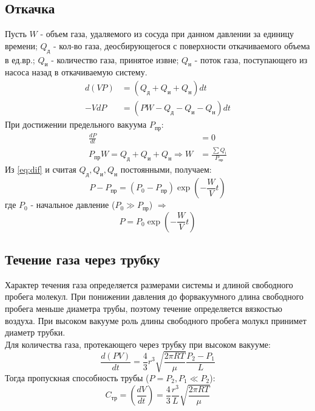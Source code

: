 \subsection*{Откачка}
Пусть $W$ - объем газа, удаляемого из сосуда при данном давлении за 
единицу времени; $Q_{\text{д}}$ - кол-во газа, деосбирующегося с поверхности 
откачиваемого объема в ед.вр.; $Q_{\text{и}}$ - количество газа, принятое
извне; $Q_{\text{н}}$ - поток газа, поступающего из насоса назад в
откачиваемую систему. 
\begin{align}
    d(VP) &= (Q_{\text{д}} + Q_{\text{и}} + Q_{\text{н}}) dt \label{eq:dif}\\
    -VdP &= (PW - Q_{\text{д}} - Q_{\text{и}} - Q_{\text{н}}) dt
\end{align}
При достижении предельного вакуума $P_{\text{пр}}$:
\begin{align}
    \frac{dP}{dt} &= 0\\ 
    P_{\text{пр}}W = Q_{\text{д}} + Q_{\text{и}} + Q_{\text{н}} \Rightarrow W &= \frac{\sum Q_{\text{i}}}{P_{\text{пр}}}
\end{align}
Из \ref{eq:dif} и считая $Q_{\text{д}}, Q_{\text{и}}, Q_{\text{н}}$
постоянными, получаем:
\begin{equation}
P - P_{\text{пр}} = (P_0 - P_{\text{пр}})\exp{\left (-\frac{W}{V}t\right )}
\end{equation}
где $P_0$ - начальное давление ($P_0 \gg P_{\text{пр}}$) $\Rightarrow$
\begin{equation}
    P = P_0\exp(-\frac{W}{V}t)
\end{equation}

\subsection*{Течение газа через трубку}
Характер течения газа определяется размерами системы и длиной свободного 
пробега молекул. При понижении давления до форвакуумного длина свободного 
пробега меньше диаметра трубы, поэтому течение определяется вязкостью воздуха. 
При высоком вакууме роль длины свободного пробега молукл принимет диаметр
трубки. \\\indent 
Для количества газа, протекающего через трубку при высоком вакууме:
\begin{equation}
    \frac{d(PV)}{dt} = \frac{4}{3}r^3 \sqrt{\frac{2\pi RT}{\mu}} \frac{P_2 - P_1}{L}\label{eq:six_eq}
\end{equation}
Тогда пропускная способность трубы ($P = P_2, P_1 \ll P_2$):
\begin{equation}
    C_{\text{тр}} = \left (\frac{dV}{dt} \right ) = \frac{4}{3}\frac{r^3}{L} \sqrt{\frac{2\pi RT}{\mu}}  
\end{equation}

